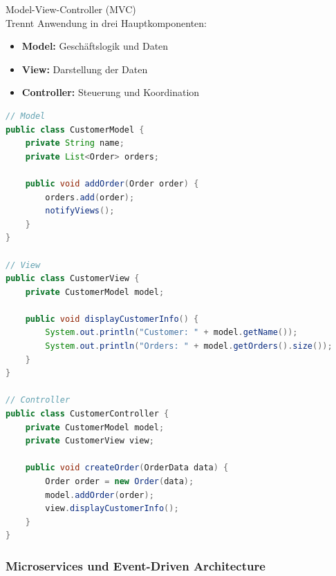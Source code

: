 \begin{concept}{Model-View-Controller (MVC)}\\
Trennt Anwendung in drei Hauptkomponenten:
\begin{itemize}
    \item \textbf{Model:} Geschäftslogik und Daten
    \item \textbf{View:} Darstellung der Daten
    \item \textbf{Controller:} Steuerung und Koordination
\end{itemize}

\begin{lstlisting}[language=Java, style=basesmol]
// Model
public class CustomerModel {
    private String name;
    private List<Order> orders;
    
    public void addOrder(Order order) {
        orders.add(order);
        notifyViews();
    }
}

// View
public class CustomerView {
    private CustomerModel model;
    
    public void displayCustomerInfo() {
        System.out.println("Customer: " + model.getName());
        System.out.println("Orders: " + model.getOrders().size());
    }
}

// Controller
public class CustomerController {
    private CustomerModel model;
    private CustomerView view;
    
    public void createOrder(OrderData data) {
        Order order = new Order(data);
        model.addOrder(order);
        view.displayCustomerInfo();
    }
}
\end{lstlisting}
\end{concept}

\subsubsection{Microservices und Event-Driven Architecture}


